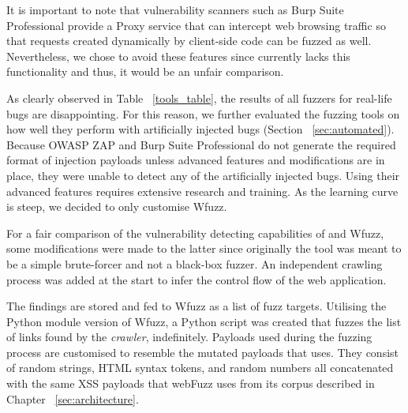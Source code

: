 It is important to note that vulnerability scanners such as Burp Suite Professional provide a Proxy service that can intercept web browsing traffic so that requests created dynamically by client-side code can be fuzzed as well. Nevertheless, we chose to avoid these features since \pname{} currently lacks this functionality and thus, it would be an unfair comparison.

As clearly observed in Table ~\ref{tools_table}, the results of all fuzzers for real-life bugs are disappointing. For this reason, we further evaluated the fuzzing tools on how well they perform with artificially injected bugs (Section ~\ref{sec:automated}). Because OWASP ZAP and Burp Suite Professional do not generate the required format of injection payloads unless advanced features and modifications are in place, they were unable to detect any of the artificially injected bugs. Using their advanced features requires extensive research and training. As the learning curve is steep, we decided to only customise Wfuzz.

For a fair comparison of the vulnerability detecting capabilities of \pname{} and Wfuzz, some modifications were made to the latter since originally the tool was meant to be a simple brute-forcer and not a black-box fuzzer. An independent crawling process was added at the start to infer the control flow of the web application. 

The findings are stored and fed to Wfuzz as a list of fuzz targets. Utilising the Python module version of Wfuzz, a Python script was created that fuzzes the list of links found by the \emph{crawler}, indefinitely. Payloads used during the fuzzing process are customised to resemble the mutated payloads that \pname{} uses. They consist of random strings, HTML syntax tokens, and random numbers all concatenated with the same XSS payloads that webFuzz uses from its corpus described in Chapter ~\ref{sec:architecture}.

